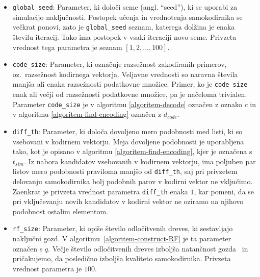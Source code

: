 \documentclass[12pt,a4paper,twoside]{article}
\theoremstyle{definition} %
\theoremstyle{plain} %
\numberwithin{equation}{section}  %
\begin{document}
\begin{itemize}
	\item \texttt{global\_seed}: Parameter, ki določi seme (angl. ``seed''), ki se uporabi za simulacijo naključnosti.
	Postopek učenja in vrednotenja samokodirnika se večkrat ponovi, zato je \texttt{global\_seed} seznam, katerega dolžina je enaka številu iteracij.
	Tako ima postopek v vsaki iteraciji novo seme. 
	Privzeta vrednost tega parametra je seznam $[1,2,\ldots,100]$.

	\item \texttt{code\_size}: Parameter, ki označuje razsežnost zakodiranih primerov, oz.\ razsežnost kodirnega vektorja. 
	Veljavne vrednosti so naravna števila manjša ali enaka razsežnosti podatkovne množice.
	Primer, ko je \texttt{code\_size} enak ali večji od razsežnosti podatkovne množice, pa je načeloma trivialen.
	Parameter \texttt{code\_size} je v algoritmu \ref{algoritem-decode} označen z oznako $c$ in v algoritmu \ref{algoritem-find-encoding} označen z $d_{code}$. 
	
	\item \texttt{diff\_th}: Parameter, ki določa dovoljeno mero podobnosti med listi, ki so vsebovani v kodirnem vektorju.
	Meja dovoljene podobnosti je uporabljena tako, kot je opisano v algoritmu \ref{algoritem-find-encoding}, kjer je označena s $t_{\mathit{sim}}$.
	Iz nabora kandidatov vsebovanih v kodirnem vektorju, ima poljuben par listov mero podobnosti praviloma manjšo od \texttt{diff\_th}, 
	saj pri privzetem delovanju samokodirnika bolj podobnih parov v kodirni vektor ne vključimo.
	Zaenkrat je privzeta vrednost parametra \texttt{diff\_th} enaka $1$, kar pomeni, da se pri vključevanju novih kandidatov v kodirni vektor ne oziramo na njihovo podobnost ostalim elementom. 

	\item \texttt{rf\_size}: Parameter, ki opiše število odločitvenih dreves, ki sestavljajo naključni gozd. 
	V algoritmu~\ref{algoritem-construct-RF} je ta parameter označen s $q$. 
	Večje število odločitvenih dreves izboljša natančnost gozda~\cite[str.\ 113]{louppe2015understanding} in pričakujemo, da posledično izboljša kvaliteto samokodirnika.
	Privzeta vrednost parametra je $100$.

\end{itemize}
\end{document}
